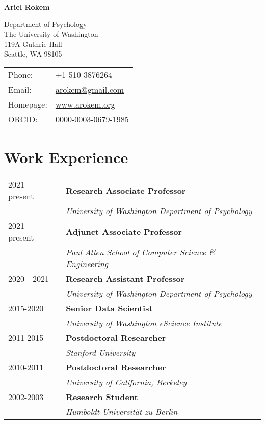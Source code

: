 \documentclass[11pt,fullpage]{article}
\def\name{Ariel Rokem}
\begin{document}
%

\centerline{\Large \bf \name}

\vspace{0.25in}

\begin{minipage}{0.50\linewidth}
  Department of Psychology\\
  The University of Washington\\
  119A Guthrie Hall\\
  Seattle, WA 98105\\
\end{minipage}
\begin{minipage}{0.50\linewidth}
  \begin{tabular}{ll}
    Phone: & +1-510-3876264 \\
    Email: & \href{mailto:arokem@gmail.com}{arokem@gmail.com} \\
    Homepage: & \href{http://arokem.org/}{www.arokem.org} \\
    ORCID: & \href{http://orcid.org/0000-0003-0679-1985}{0000-0003-0679-1985} \\
  \end{tabular}
\end{minipage}

\section*{Work Experience}
\begin{tabular}{ll}

  2021 -  present & {\bf Research Associate Professor} \\ & \emph{University of Washington Department of Psychology}\\
  2021 -  present & {\bf Adjunct Associate Professor} \\ & \emph{Paul Allen School of Computer Science \& Engineering}\\
  2020 - 2021 & {\bf Research Assistant Professor} \\ & \emph{University of Washington Department of Psychology}\\
  2015-2020 & {\bf Senior Data Scientist}\\ & \emph{University of Washington eScience Institute}\\
  2011-2015 & {\bf Postdoctoral Researcher}\\ & \emph{Stanford University}\\
  2010-2011 & {\bf Postdoctoral Researcher}\\ & \emph{University of California, Berkeley}\\
  2002-2003 & {\bf Research Student}\\ & \emph{Humboldt-Universit\"{a}t zu Berlin}\\

\end{tabular}
\end{document}
